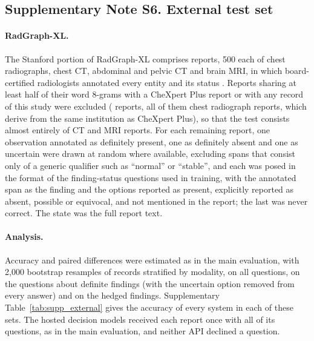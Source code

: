 \documentclass[11pt]{article}
\begin{document}
\FloatBarrier
\subsection*{Supplementary Note S6. External test set}

\paragraph{RadGraph-XL.} The Stanford portion of RadGraph-XL comprises  reports, 500 each of chest radiographs, chest CT, abdominal and pelvic CT and brain MRI, in which board-certified radiologists annotated every entity and its status \citep{delbrouck2024radgraphxl}. Reports sharing at least half of their word 8-grams with a CheXpert Plus report or with any record of this study were excluded ( reports, all of them chest radiograph reports, which derive from the same institution as CheXpert Plus), so that the test consists almost entirely of CT and MRI reports. For each remaining report, one observation annotated as definitely present, one as definitely absent and one as uncertain were drawn at random where available, excluding spans that consist only of a generic qualifier such as ``normal'' or ``stable'', and each was posed in the format of the finding-status questions used in training, with the annotated span as the finding and the options reported as present, explicitly reported as absent, possible or equivocal, and not mentioned in the report; the last was never correct. The state was the full report text.

\paragraph{Analysis.} Accuracy and paired differences were estimated as in the main evaluation, with 2,000 bootstrap resamples of records stratified by modality, on all questions, on the questions about definite findings (with the uncertain option removed from every answer) and on the hedged findings. Supplementary Table~\ref{tab:supp_external} gives the accuracy of every system in each of these sets. The hosted decision models received each report once with all of its questions, as in the main evaluation, and neither API declined a question.

\FloatBarrier

\end{document}
